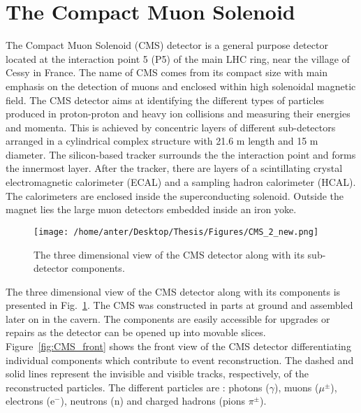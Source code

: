 \section{The Compact Muon Solenoid}
The Compact Muon Solenoid (CMS) detector is a general purpose detector located at the interaction point 5 (P5) of the main LHC ring, near the village of Cessy in France. The name of CMS comes from its compact size with main emphasis on the detection of muons and enclosed within high solenoidal magnetic field. The CMS detector aims at identifying the different types of particles produced in proton-proton and heavy ion collisions and measuring their energies and momenta. This is achieved by concentric layers of different sub-detectors arranged in a cylindrical complex structure with 21.6 m length and 15 m diameter. The silicon-based tracker surrounds the the interaction point and forms the innermost layer. After the tracker, there are layers of a scintillating crystal electromagnetic calorimeter (ECAL) and a sampling hadron calorimeter (HCAL). The calorimeters are enclosed inside the superconducting solenoid. Outside the magnet lies the large muon detectors embedded inside an iron yoke. 
\begin{figure}[!h]
\begin{center}
\vspace{2mm}
\hspace*{-6mm}
\texttt{[image: /home/anter/Desktop/Thesis/Figures/CMS\_2\_new.png]}\\
\vspace*{5mm}
\caption[The three dimensional view of the CMS detector along with its sub-detector components.]{The three dimensional view of the CMS detector along with its sub-detector components\footnotemark.}
\label{fig:CMS}
\end{center}
\end{figure}
The three dimensional view of the CMS detector along with its components is presented in Fig.~\ref{fig:CMS}. The CMS was constructed in parts at ground and assembled later on in the cavern. The components are easily accessible for upgrades or repairs as the detector can be opened up into movable slices. Figure~\ref{fig:CMS_front} shows the front view of the CMS detector differentiating individual components which contribute to event reconstruction. The dashed and solid lines represent the invisible and visible tracks, respectively, of the reconstructed particles. The different particles are : photons ($\gamma$), muons ($\mu^{\pm}$), electrons (e$^{-}$), neutrons (n) and charged hadrons (pions $\pi^{\pm}$).

